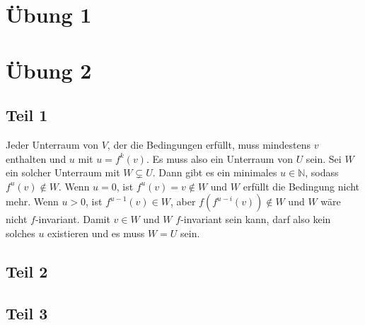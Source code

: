 \documentclass[10pt,a4paper]{article}
\begin{document}
\section*{Übung 1}

\section*{Übung 2}

\subsection*{Teil 1}

Jeder Unterraum von $V$, der die Bedingungen erfüllt, muss mindestens $v$ enthalten und $u$ mit $u = f^{k}(v)$.
Es muss also ein Unterraum von $U$ sein.
Sei $W$ ein solcher Unterraum mit $W \subsetneq U$.
Dann gibt es ein minimales $u \in \mathbb{N}$, sodass $f^{u}(v) \notin W$.
Wenn $u = 0$, ist $f^{u}(v) = v \notin W$ und $W$ erfüllt die Bedingung nicht mehr.
Wenn $u > 0$, ist $f^{u - 1}(v) \in W$, aber $f(f^{u - i}(v)) \notin W$ und $W$ wäre nicht $f$-invariant.
Damit $v \in W$ und $W$ $f$-invariant sein kann, darf also kein solches $u$ existieren und es muss $W = U$ sein.

\subsection*{Teil 2}

\subsection*{Teil 3}
\end{document}
